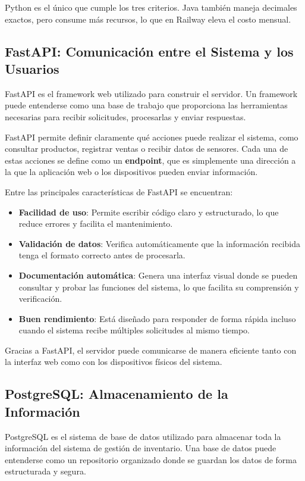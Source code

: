 Python es el único que cumple los tres criterios. Java también maneja decimales exactos, pero consume más recursos, lo que en Railway eleva el costo mensual.

\subsection{FastAPI: Comunicación entre el Sistema y los Usuarios}

FastAPI es el framework web utilizado para construir el servidor. Un framework puede entenderse como una base de trabajo que proporciona las herramientas necesarias para recibir solicitudes, procesarlas y enviar respuestas.

FastAPI permite definir claramente qué acciones puede realizar el sistema, como consultar productos, registrar ventas o recibir datos de sensores. Cada una de estas acciones se define como un \textbf{endpoint}, que es simplemente una dirección a la que la aplicación web o los dispositivos pueden enviar información.

Entre las principales características de FastAPI se encuentran:

\begin{itemize}
    \item \textbf{Facilidad de uso}: Permite escribir código claro y estructurado, lo que reduce errores y facilita el mantenimiento.
    \item \textbf{Validación de datos}: Verifica automáticamente que la información recibida tenga el formato correcto antes de procesarla.
    \item \textbf{Documentación automática}: Genera una interfaz visual donde se pueden consultar y probar las funciones del sistema, lo que facilita su comprensión y verificación.
    \item \textbf{Buen rendimiento}: Está diseñado para responder de forma rápida incluso cuando el sistema recibe múltiples solicitudes al mismo tiempo.
\end{itemize}

Gracias a FastAPI, el servidor puede comunicarse de manera eficiente tanto con la interfaz web como con los dispositivos físicos del sistema.

\subsection{PostgreSQL: Almacenamiento de la Información}

PostgreSQL es el sistema de base de datos utilizado para almacenar toda la información del sistema de gestión de inventario. Una base de datos puede entenderse como un repositorio organizado donde se guardan los datos de forma estructurada y segura.

